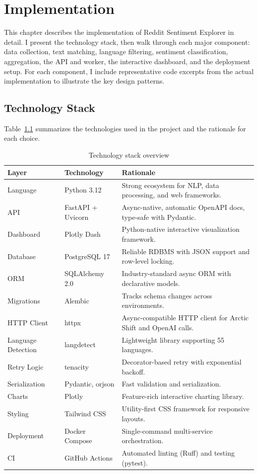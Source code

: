 \chapter{Implementation}
\label{ch:implementation}

This chapter describes the implementation of Reddit Sentiment Explorer in detail. I present the technology stack, then walk through each major component: data collection, text matching, language filtering, sentiment classification, aggregation, the API and worker, the interactive dashboard, and the deployment setup. For each component, I include representative code excerpts from the actual implementation to illustrate the key design patterns.

\section{Technology Stack}
\label{sec:tech_stack}

Table~\ref{tab:tech_stack} summarizes the technologies used in the project and the rationale for each choice.

\begin{table}[H]
\centering
\caption{Technology stack overview}
\label{tab:tech_stack}
\small
\begin{tabularx}{\textwidth}{ll>{\raggedright\arraybackslash}X}
\toprule
\textbf{Layer} & \textbf{Technology} & \textbf{Rationale} \\
\midrule
Language & Python 3.12 & Strong ecosystem for NLP, data processing, and web frameworks. \\
API & FastAPI + Uvicorn & Async-native, automatic OpenAPI docs, type-safe with Pydantic. \\
Dashboard & Plotly Dash & Python-native interactive visualization framework. \\
Database & PostgreSQL 17 & Reliable RDBMS with JSON support and row-level locking. \\
ORM & SQLAlchemy 2.0 & Industry-standard async ORM with declarative models. \\
Migrations & Alembic & Tracks schema changes across environments. \\
HTTP Client & httpx & Async-compatible HTTP client for Arctic Shift and OpenAI calls. \\
Language Detection & langdetect & Lightweight library supporting 55 languages. \\
Retry Logic & tenacity & Decorator-based retry with exponential backoff. \\
Serialization & Pydantic, orjson & Fast validation and serialization. \\
Charts & Plotly & Feature-rich interactive charting library. \\
Styling & Tailwind CSS & Utility-first CSS framework for responsive layouts. \\
Deployment & Docker Compose & Single-command multi-service orchestration. \\
CI & GitHub Actions & Automated linting (Ruff) and testing (pytest). \\
\bottomrule
\end{tabularx}
\end{table}

